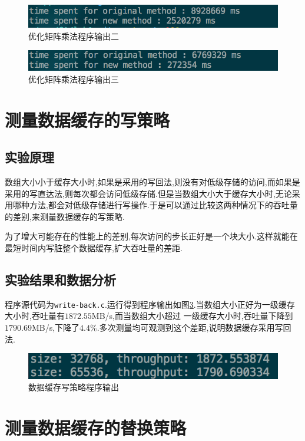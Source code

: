 \documentclass[adobefonts, nocap]{ctexart}
\begin{document}
    \begin{figure}[htbp]
      \includegraphics[width=12cm]{10.png}
      \caption{优化矩阵乘法程序输出二}
      \label{fig10}
    \end{figure}

    \begin{figure}[htbp]
      \includegraphics[width=12cm]{11.png}
      \caption{优化矩阵乘法程序输出三}
      \label{fig11}
    \end{figure}
    \clearpage
  \section{测量数据缓存的写策略}
    \subsection{实验原理}
      数组大小小于缓存大小时,如果是采用的写回法,则没有对低级存储的访问,而如果是采用的写直达法,则每次都会访问低级存储.但是当数组大小大于缓存大小时,无论采用哪种方法,都会对低级存储进行写操作.于是可以通过比较这两种情况下的吞吐量的差别,来测量数据缓存的写策略.

      为了增大可能存在的性能上的差别,每次访问的步长正好是一个块大小.这样就能在最短时间内写脏整个数据缓存,扩大吞吐量的差距.
    \subsection{实验结果和数据分析}
      程序源代码为\texttt{write-back.c}.运行得到程序输出如图\ref{fig7}.当数组大小正好为一级缓存大小时,吞吐量有$1872.55$MB/s,而当数组大小超过
      一级缓存大小时,吞吐量下降到$1790.69$MB/s,下降了$4.4\%$.多次测量均可观测到这个差距,说明数据缓存采用写回法.

      \begin{figure}[htbp]
        \includegraphics[width=12cm]{7.png}
        \caption{数据缓存写策略程序输出}
        \label{fig7}
      \end{figure}
  \section{测量数据缓存的替换策略}
\end{document}
